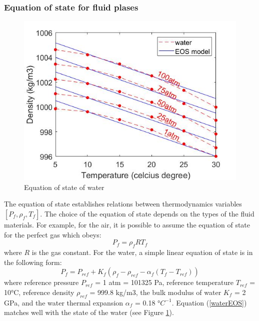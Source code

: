 \documentclass[preprint,12pt]{elsarticle}
\providecommand{\DIFaddend}{} %
\DeclareRobustCommand{\DIFaddend}{\DIFOaddend \let\includegraphics\DIFOincludegraphics} %
\begin{document}
\subsubsection{Equation of state for fluid plases}
%
%
\begin{figure}[H]
\center
\includegraphics[scale=.5]{water1.jpg}
\caption{Equation of state of water}
\label{fig:water1}
\end {figure}
%
%
The equation of state establishes relations between thermodynamics variables $[P_f, \rho_f, T_f]$. The choice of the equation of state depends on the types of the fluid materials. For example, for the air, it is possible to assume the equation of state for the perfect gas which obeys:
%
%
\begin{equation}
    P_f = \rho_f R T_f
\end {equation}
%
%
where $R$ is the gas constant. For the water, a simple linear equation of state is in the following form:
%
%
\begin{equation}
    P_f = P_{ref} + K_f (\rho_f - \rho_{ref} - \alpha_f(T_f - T_{ref}))
\label{waterEOS}
\end {equation}
%
%
where reference pressure $P_{ref}$ = 1 atm = 101325 Pa, reference temperature $T_{ref}$ = 10°C, reference density  $\rho_{ref}$ = 999.8 kg/m3, the bulk modulus of water $K_f$ = 2 GPa, and the water thermal expansion $\alpha_f$ = 0.18 °$C^{-1}$. Equation (\ref{waterEOS}) matches well with the state of the water (see Figure \ref{fig:water1}).
\DIFaddend %
\end{document}
